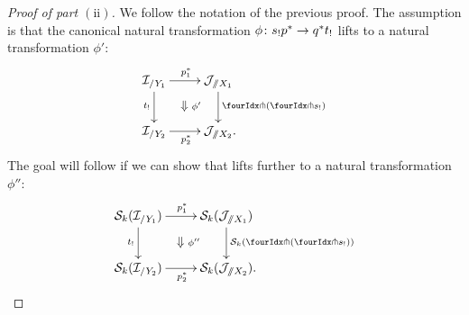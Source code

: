 \documentclass[reqno,10pt,a4paper,oneside,draft]{amsart}
\begin{document}
\begin{proof}[Proof of part $\mathrm{(ii)}$]
We follow the notation of the previous proof.
The assumption is that the canonical natural transformation $\phi \colon s_! p^* \to q^* t_!$ lifts to a natural transformation $\phi'$:
\begin{equation*} %
\begin{gathered}
\xymatrix{
  \cal{I}_{/Y_1}
  \ar[r]^{p_1^*}
  \ar[d]_{t_!}
  \ar@{}[dr]|{\textstyle\Downarrow \rlap{$\labelstyle\phi'$}}
&
  \cal{J}_{\fakeslice X_1}
  \ar[d]^{\liftl{(\liftr{s_!})}}
\\
  \cal{I}_{/Y_2}
  \ar[r]_{p_2^*}
&
  \cal{J}_{\fakeslice X_2}
\rlap{.}}
\end{gathered}
\end{equation*}
The goal will follow if we can show that lifts further to a natural transformation $\phi''$:
\begin{equation*} %
\begin{gathered}
\xymatrix{
  \cal{S}_k(\cal{I}_{/Y_1})
  \ar[r]^{p_1^*}
  \ar[d]_{t_!}
  \ar@{}[dr]|{\textstyle\Downarrow \rlap{$\labelstyle\phi''$}}
&
  \cal{S}_k(\cal{J}_{\fakeslice X_1})
  \ar[d]^{\cal{S}_k(\liftl{(\liftr{s_!})})}
\\
  \cal{S}_k(\cal{I}_{/Y_2})
  \ar[r]_{p_2^*}
&
  \cal{S}_k(\cal{J}_{\fakeslice X_2})
\rlap{.}}
\end{gathered}
\end{equation*}


\end{proof}
\end{document}
